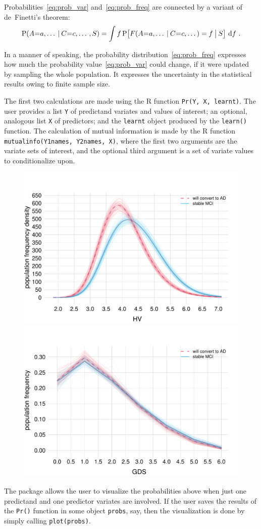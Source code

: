 Probabilities~\eqref{eq:prob_var} and~\eqref{eq:prob_freq} are connected by a variant of de~Finetti's theorem:
\begin{equation}
  \label{eq:definetti1}
  \P(A \mo a, \dotso \|C \mo c, \dotso , S)  =
  \int \yf \,
  \P\bigl[ \yF(A \mo a, \dotso \|C \mo c, \dotso) = \yf \|[\big] S\bigr]
  \,\di\yf \ .
\end{equation}

In a manner of speaking, the probability distribution~\eqref{eq:prob_freq} expresses how much the probability value~\eqref{eq:prob_var} could change, if it were updated by sampling the whole population. It expresses the uncertainty in the statistical results owing to finite sample size.

The first two calculations are made using the R function \texttt{Pr(Y, X, learnt)}. The user provides a list \texttt{Y} of predictand variates and values of interest; an optional, analogous list \texttt{X} of predictors; and the \texttt{learnt} object produced by the \texttt{learn()} function. The calculation of mutual information is made by the R function \texttt{mutualinfo(Y1names, Y2names, X)}, where the first two arguments are the variate sets of interest, and the optional third argument is a set of variate values to conditionalize upon.

\medskip

\begin{figure}[t]
\centering%
\includegraphics[width=0.45\linewidth]{figures/population_distr_HV.pdf}\hfill%
\includegraphics[width=0.45\linewidth]{figures/population_distr_GDS.pdf}%
\\ \caption{}\label{fig:distr}
\end{figure}
The package allows the user to visualize the probabilities above when just one predictand and one predictor variates are involved. If the user saves the results of the \texttt{Pr()} function in some object \texttt{probs}, say, then the visualization is done by simply calling \texttt{plot(probs)}.

